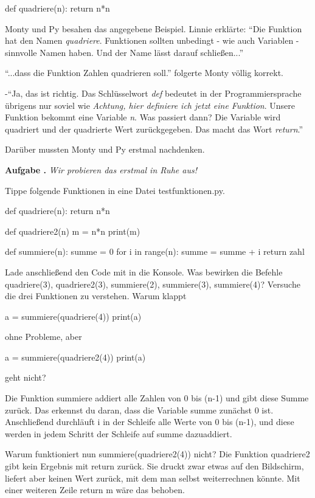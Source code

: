 \documentclass[a5paper,12pt,twoside,openright]{scrbook}
\newlength{\aufgabenskip}
\newcounter{aufgabennummer}
\newenvironment{aufgabeUnshaded}[1]{
  \refstepcounter{aufgabennummer}
  \textbf{Aufgabe \theaufgabennummer.} \emph{#1} \par
}{\vspace{\aufgabenskip}}
\begin{document}
\begin{pythoncode}
def quadriere(n):
    return n*n   
\end{pythoncode}

Monty und Py besahen das angegebene Beispiel.
Linnie erklärte:
``Die Funktion hat den Namen \emph{quadriere}. Funktionen sollten unbedingt - wie auch Variablen - sinnvolle Namen haben.
Und der Name lässt darauf schließen...''

``...dass die Funktion Zahlen quadrieren soll.'' folgerte Monty völlig korrekt.

-``Ja, das ist richtig. Das Schlüsselwort \emph{def} bedeutet in der Programmiersprache übrigens nur soviel wie \emph{Achtung, hier 
definiere ich jetzt eine Funktion}. Unsere Funktion bekommt eine Variable \textit{n}. Was passiert dann? 
Die Variable wird quadriert und der quadrierte Wert zurückgegeben. Das macht das Wort \emph{return}.''

Darüber mussten Monty und Py erstmal nachdenken.

\begin{aufgabeUnshaded}{Wir probieren das erstmal in Ruhe aus!}
Tippe folgende Funktionen in eine Datei testfunktionen.py. 
\begin{pythoncode}
def quadriere(n):
    return n*n  

def quadriere2(n)
    m = n*n
    print(m)
    
def summiere(n):
    summe = 0 
    for i in range(n):
        summe = summe + i
    return zahl    
\end{pythoncode}

Lade anschlie{\ss}end den Code mit 
 in die Konsole.
Was bewirken die Befehle quadriere(3), quadriere2(3), summiere(2), summiere(3), summiere(4)? 
Versuche die drei Funktionen zu verstehen.
Warum klappt 
\begin{pythoncode}
 a = summiere(quadriere(4))
 print(a)
\end{pythoncode} 
ohne Probleme, aber 
\begin{pythoncode}
 a = summiere(quadriere2(4))
 print(a)
\end{pythoncode}
geht nicht?
\end{aufgabeUnshaded}

\begin{lip}{}
 Die Funktion summiere addiert alle Zahlen von 0 bis (n-1) und gibt diese Summe zurück.
 Das erkennst du daran, dass die Variable summe zunächst 0 ist.
 Anschließend durchläuft i in der Schleife alle Werte von 0 bis (n-1), und diese werden in jedem Schritt der Schleife auf 
 summe dazuaddiert.
 
 Warum funktioniert nun summiere(quadriere2(4)) nicht? 
 Die Funktion quadriere2 gibt kein Ergebnis mit return zurück. Sie druckt zwar etwas auf den Bildschirm, liefert aber keinen Wert zurück, 
 mit dem man selbst weiterrechnen könnte.
 Mit einer weiteren Zeile return m wäre das behoben.
\end{lip}
\end{document}
